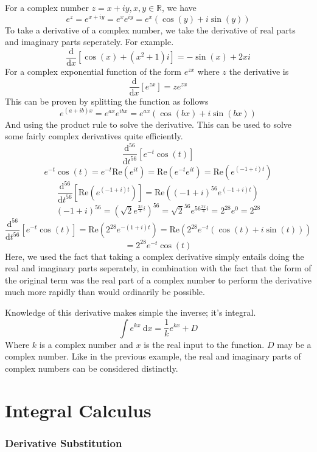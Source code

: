 \documentclass[12pt]{report}
\newcommand{\R}{\mathbb{R}}
\newcommand{\dx}{\:\mathrm{d}x}
\newcommand{\derivx}[1]{\frac{\mathrm{d}}{\mathrm{d}x}\left[#1\right]}
\begin{document}
\begin{flushleft}
For a complex number \(z = x + iy, x, y \in \R\), we have
\[e^z = e^{x + iy} = e^xe^{iy} = e^x(\cos(y) + i\sin(y))\]
To take a derivative of a complex number, we take the derivative of real parts
and imaginary parts seperately. For example.
\[\derivx{\cos(x) + (x^2 + 1)i} = -\sin(x) + 2xi\]
For a complex exponential function of the form \(e^{zx}\) where \(z\) the 
derivative is
\[\derivx{e^{zx}} = ze^{zx}\]
This can be proven by splitting the function as follows
\[e^{(a + ib)x} = e^{ax}e^{ibx} = e^{ax}(\cos(bx) + i\sin(bx))\]
And using the product rule to solve the derivative. This can be used to solve
some fairly complex derivatives quite efficiently.
\[\frac{\mathrm{d}^{56}}{\mathrm{d}t^{56}}\left[e^{-t}\cos(t)\right]\]
\[e^{-t}\cos(t) = e^{-t}\mathrm{Re}\left(e^{it}\right) = 
\mathrm{Re}\left(e^{-t}e^{it}\right) = \mathrm{Re}\left(e^{(-1 + i)t}\right)\]
\[\frac{\mathrm{d}^{56}}{\mathrm{d}t^{56}}\left[\mathrm{Re}
\left(e^{(-1 + i)t}\right)\right] = 
\mathrm{Re}\left((-1 + i)^{56}e^{(-1 + i)t}\right)\]
\[\left(-1 + i\right)^{56} = \left(\sqrt{2}e^{\frac{3\pi}{4}i}\right)^{56}
= \sqrt{2}^{56}e^{56\frac{3\pi}{4}i} = 2^{28}e^{0} = 2^{28}\]
\[\frac{\mathrm{d}^{56}}{\mathrm{d}t^{56}}\left[e^{-t}\cos(t)\right] = 
\mathrm{Re}\left(2^{28}e^{-(1 + i)t}\right) = 
\mathrm{Re}\left(2^{28}e^{-t}(\cos(t) + i\sin(t))\right) \]
\[= 2^{28}e^{-t}\cos(t)\]
Here, we used the fact that taking a complex derivative simply entails doing
the real and imaginary parts seperately, in combination with the fact that the
form of the original term was the real part of a complex number to perform the
derivative much more rapidly than would ordinarily be possible. \par
Knowledge of this derivative makes simple the inverse; it's integral.
\[\int e^{kx} \dx = \frac{1}{k}e^{kx} + D\]
Where \(k\) is a complex number and \(x\) is the real input to the function.
\(D\) may be a complex number. Like in the previous example, the real and 
imaginary parts of complex numbers can be considered distinctly.

\section*{Integral Calculus}

\subsubsection*{Derivative Substitution}


\end{flushleft}
\end{document}
